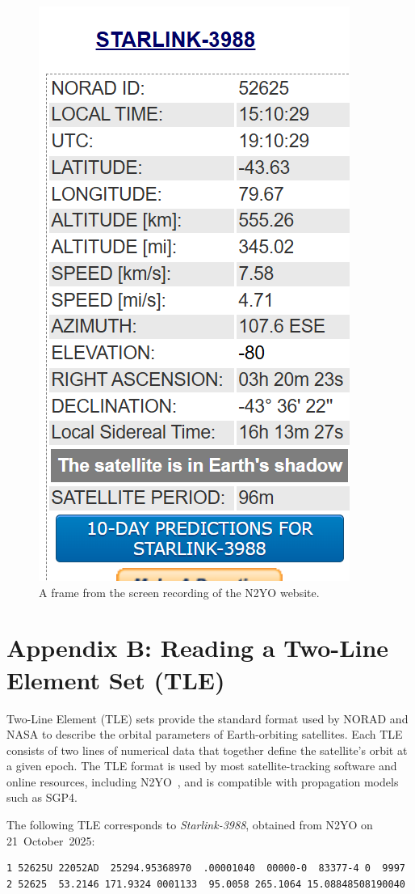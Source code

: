\documentclass{article}
\begin{document}
\begin{figure}[h]
    \centering
    \includegraphics[width=0.5\linewidth]{LaTeX/Figures/N2YO .png}
    \caption{A frame from the screen recording of the N2YO website.}
    \label{fig:n2yo_screenshot}
\end{figure}

\newpage
\section*{Appendix B: Reading a Two-Line Element Set (TLE)}
\label{AppendixB}

Two-Line Element (TLE) sets provide the standard format used by NORAD and NASA to describe the orbital parameters of Earth-orbiting satellites. Each TLE consists of two lines of numerical data that together define the satellite's orbit at a given epoch. The TLE format is used by most satellite-tracking software and online resources, including N2YO~\cite{n2yo_starlink3988}, and is compatible with propagation models such as SGP4.

\noindent The following TLE corresponds to \textit{Starlink-3988}, obtained from N2YO on 21~October~2025:

\begin{verbatim}
1 52625U 22052AD  25294.95368970  .00001040  00000-0  83377-4 0  9997
2 52625  53.2146 171.9324 0001133  95.0058 265.1064 15.08848508190040
\end{verbatim}
\end{document}
